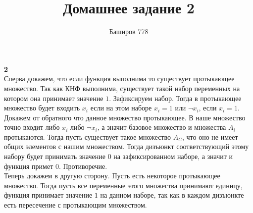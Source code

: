\documentclass[a4paper,12pt]{article}
\author{Баширов 778}
\title{Домашнее задание 2}
\begin{document}
\maketitle
\newpage

\large\textbf{2}\normalsize\\
Сперва докажем, что если функция выполнима то существует протыкающее множество. Так как КНФ выполнима, существует такой набор переменных на котором она принимает значение $1$. Зафиксируем набор. Тогда в протыкающее множество будет входить $x_{i}$ если на этом наборе $x_{i} = 1$ или $\neg x_{i}$, если $x_{i} = 1$. Докажем от обратного что данное множество протыкающее. В наше множество точно входит либо $x_{i}$ либо $\neg x_{i}$, а значит базовое множество и множества $A_{i}$ протыкаются. Тогда пусть существует такое множество $A_{C}$, что оно не имеет общих элементов с нашим множеством. Тогда дизъюнкт соответствующий этому набору будет принимать значение $0$ на зафиксированном наборе, а значит и функция примет $0$. Противоречие.\\
Теперь докажем в другую сторону. Пусть есть некоторое протыкающее множество. Тогда пусть все переменные этого множества принимают единицу, функция принимает значение $1$ на данном наборе, так как в каждом дизъюнкте есть пересечение с протыкающим множеством. 
\end{document}
